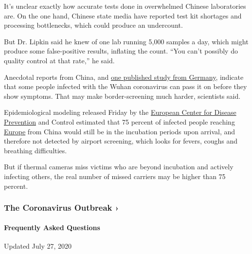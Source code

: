 It's unclear exactly how accurate tests done in overwhelmed Chinese
laboratories are. On the one hand, Chinese state media have reported
test kit shortages and processing bottlenecks, which could produce an
undercount.

But Dr. Lipkin said he knew of one lab running 5,000 samples a day,
which might produce some false-positive results, inflating the count.
``You can't possibly do quality control at that rate,'' he said.

Anecdotal reports from China, and
\href{https://www.scientificamerican.com/article/study-reports-first-case-of-coronavirus-spread-by-asymptomatic-person/}{one
published study from Germany}, indicate that some people infected with
the Wuhan coronavirus can pass it on before they show symptoms. That may
make border-screening much harder, scientists said.

Epidemiological modeling released Friday by the
\href{https://www.nytimes3xbfgragh.onion/2020/02/10/world/europe/coronavirus-europe.html}{European
Center for Disease Prevention} and Control estimated that 75 percent of
infected people reaching
\href{https://www.nytimes3xbfgragh.onion/2020/02/10/world/europe/coronavirus-europe.html}{Europe}
from China would still be in the incubation periods upon arrival, and
therefore not detected by airport screening, which looks for fevers,
coughs and breathing difficulties.

But if thermal cameras miss victims who are beyond incubation and
actively infecting others, the real number of missed carriers may be
higher than 75 percent.

\href{https://www.nytimes3xbfgragh.onion/news-event/coronavirus?action=click\&pgtype=Article\&state=default\&region=MAIN_CONTENT_3\&context=storylines_faq}{}

\hypertarget{the-coronavirus-outbreak-}{%
\subsubsection{The Coronavirus Outbreak
›}\label{the-coronavirus-outbreak-}}

\hypertarget{frequently-asked-questions}{%
\paragraph{Frequently Asked
Questions}\label{frequently-asked-questions}}

Updated July 27, 2020

